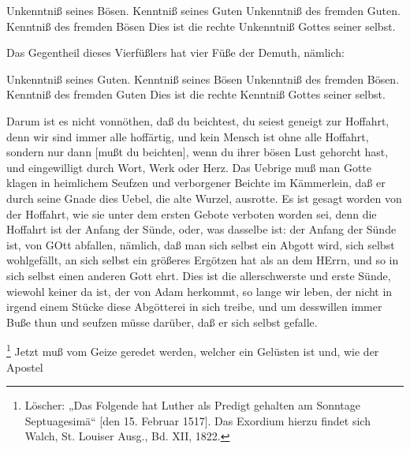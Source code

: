 Unkenntniß seines Bösen. Kenntniß seines Guten Unkenntniß des fremden Guten. Kenntniß des fremden Bösen Dies ist die rechte Unkenntniß Gottes seiner selbst.

Das Gegentheil dieses Vierfüßlers hat vier Füße der Demuth, nämlich:

Unkenntniß seines Guten. Kenntniß seines Bösen Unkenntniß des fremden Bösen. Kenntniß des fremden Guten Dies ist die rechte Kenntniß Gottes seiner selbst.

Darum ist es nicht vonnöthen, daß du beichtest, du seiest geneigt zur Hoffahrt, denn wir sind immer alle hoffärtig, und kein Mensch ist ohne alle Hoffahrt, sondern nur dann [mußt du beichten], wenn du ihrer bösen Lust gehorcht hast, und eingewilligt durch Wort, Werk oder Herz. Das Uebrige muß man Gotte klagen in heimlichem Seufzen und verborgener Beichte im Kämmerlein, daß er durch seine Gnade dies Uebel, die alte Wurzel, ausrotte. Es ist gesagt worden von der Hoffahrt, wie sie unter dem ersten Gebote verboten worden sei, denn die Hoffahrt ist der Anfang der Sünde, oder, was dasselbe ist: der Anfang der Sünde ist, von GOtt abfallen, nämlich, daß man sich selbst ein Abgott wird, sich selbst wohlgefällt, an sich selbst ein größeres Ergötzen hat als an dem HErrn, und so in sich selbst einen anderen Gott ehrt. Dies ist die allerschwerste und erste Sünde, wiewohl keiner da ist, der von Adam herkommt, so lange wir leben, der nicht in irgend einem Stücke diese Abgötterei in sich treibe, und um desswillen immer Buße thun und seufzen müsse darüber, daß er sich selbst gefalle.

\footnote{Löscher: „Das Folgende hat Luther als Predigt gehalten am Sonntage Septuagesimä“ [den 15. Februar 1517]. Das Exordium hierzu findet sich Walch, St. Louiser Ausg., Bd. XII, 1822.} Jetzt muß vom Geize geredet werden, welcher ein Gelüsten ist und, wie der Apostel

